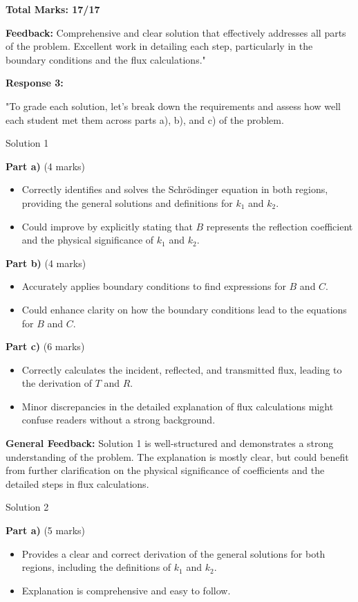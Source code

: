 \documentclass[a4paper,11pt]{article}
\begin{document}
\textbf{Total Marks: 17/17}

\textbf{Feedback:} Comprehensive and clear solution that effectively addresses all parts of the problem. Excellent work in detailing each step, particularly in the boundary conditions and the flux calculations."

\textbf{Response 3:}

"To grade each solution, let's break down the requirements and assess how well each student met them across parts a), b), and c) of the problem.

Solution 1

\textbf{Part a)} (4 marks)
\begin{itemize}
    \item Correctly identifies and solves the Schrödinger equation in both regions, providing the general solutions and definitions for \(k_1\) and \(k_2\).
    \item Could improve by explicitly stating that \(B\) represents the reflection coefficient and the physical significance of \(k_1\) and \(k_2\).
\end{itemize}

\textbf{Part b)} (4 marks)
\begin{itemize}
    \item Accurately applies boundary conditions to find expressions for \(B\) and \(C\).
    \item Could enhance clarity on how the boundary conditions lead to the equations for \(B\) and \(C\).
\end{itemize}

\textbf{Part c)} (6 marks)
\begin{itemize}
    \item Correctly calculates the incident, reflected, and transmitted flux, leading to the derivation of \(T\) and \(R\).
    \item Minor discrepancies in the detailed explanation of flux calculations might confuse readers without a strong background.
\end{itemize}

\textbf{General Feedback:} Solution 1 is well-structured and demonstrates a strong understanding of the problem. The explanation is mostly clear, but could benefit from further clarification on the physical significance of coefficients and the detailed steps in flux calculations.

Solution 2

\textbf{Part a)} (5 marks)
\begin{itemize}
    \item Provides a clear and correct derivation of the general solutions for both regions, including the definitions of \(k_1\) and \(k_2\).
    \item Explanation is comprehensive and easy to follow.
\end{itemize}
\end{document}
